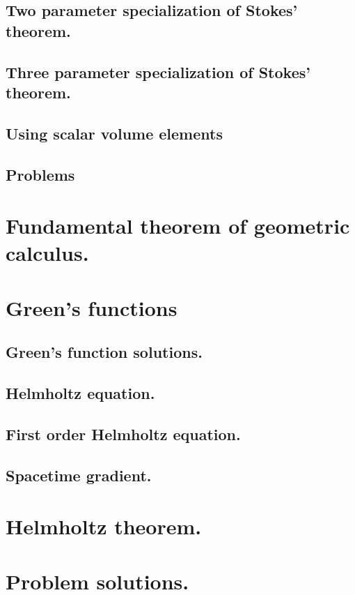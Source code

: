       \subsection{Two parameter specialization of Stokes' theorem.}
         
      \subsection{Three parameter specialization of Stokes' theorem.}
         
      \subsection{Using scalar volume elements}
         
      \subsection{Problems}
         
         

   \section{Fundamental theorem of geometric calculus.}
      
   \section{Green's functions}
      
      \subsection{Green's function solutions.}
         
      \subsection{Helmholtz equation.}
         
      \subsection{First order Helmholtz equation.}
         
      \subsection{Spacetime gradient.}
         
   \section{Helmholtz theorem.}
      
      
   \section{Problem solutions.}
      \shipoutAnswer
